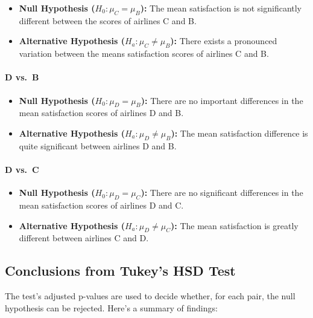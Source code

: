 \documentclass[
]{article}
\begin{document}
\begin{itemize}
\item
  \textbf{Null Hypothesis (\(H_0: \mu_C = \mu_B\)):} The mean
  satisfaction is not significantly different between the scores of
  airlines C and B.
\item
  \textbf{Alternative Hypothesis (\(H_a: \mu_C \neq \mu_B\)):} There
  exists a pronounced variation between the means satisfaction scores of
  airlines C and B.
\end{itemize}

\paragraph{D vs.~B}\label{d-vs.-b}

\begin{itemize}
\item
  \textbf{Null Hypothesis (\(H_0: \mu_D = \mu_B\)):} There are no
  important differences in the mean satisfaction scores of airlines D
  and B.
\item
  \textbf{Alternative Hypothesis (\(H_a: \mu_D \neq \mu_B\)):} The mean
  satisfaction difference is quite significant between airlines D and B.
\end{itemize}

\paragraph{D vs.~C}\label{d-vs.-c}

\begin{itemize}
\item
  \textbf{Null Hypothesis (\(H_0: \mu_D = \mu_C\)):} There are no
  significant differences in the mean satisfaction scores of airlines D
  and C.
\item
  \textbf{Alternative Hypothesis (\(H_a: \mu_D \neq \mu_C\)):} The mean
  satisfaction is greatly different between airlines C and D.
\end{itemize}

\subsection{Conclusions from Tukey's HSD
Test}\label{conclusions-from-tukeys-hsd-test}

The test's adjusted p-values are used to decide whether, for each pair,
the null hypothesis can be rejected. Here's a summary of findings:
\end{document}
